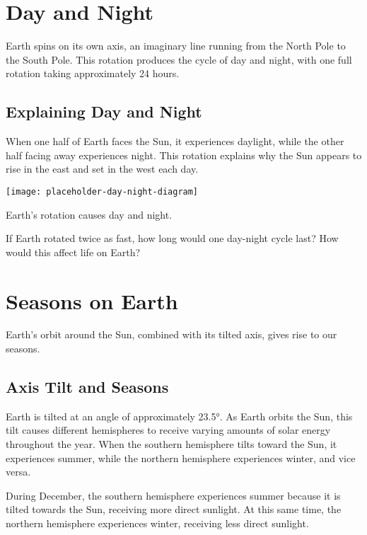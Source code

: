 \section{Day and Night}

Earth spins on its own axis, an imaginary line running from the North Pole to the South Pole. This rotation produces the cycle of day and night, with one full rotation taking approximately 24 hours.

\subsection{Explaining Day and Night}

When one half of Earth faces the Sun, it experiences daylight, while the other half facing away experiences night. This rotation explains why the Sun appears to rise in the east and set in the west each day.

\begin{marginfigure}
\texttt{[image: placeholder-day-night-diagram]}
\caption{Earth's rotation causes day and night.}
\end{marginfigure}

\begin{stopandthink}
If Earth rotated twice as fast, how long would one day-night cycle last? How would this affect life on Earth?
\end{stopandthink}

\section{Seasons on Earth}

Earth’s orbit around the Sun, combined with its tilted axis, gives rise to our seasons.

\subsection{Axis Tilt and Seasons}

Earth is tilted at an angle of approximately 23.5°. As Earth orbits the Sun, this tilt causes different hemispheres to receive varying amounts of solar energy throughout the year. When the southern hemisphere tilts toward the Sun, it experiences summer, while the northern hemisphere experiences winter, and vice versa.

\begin{example}
During December, the southern hemisphere experiences summer because it is tilted towards the Sun, receiving more direct sunlight. At this same time, the northern hemisphere experiences winter, receiving less direct sunlight.
\end{example}

